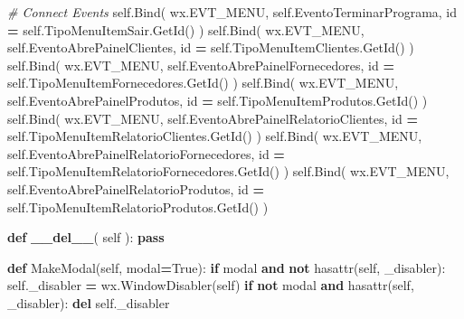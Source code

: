 \documentclass[
]{book}
\newenvironment{Shaded}{\begin{snugshade}}{\end{snugshade}}
\newcommand{\BuiltInTok}[1]{#1}
\newcommand{\CommentTok}[1]{\textcolor[rgb]{0.56,0.35,0.01}{\textit{#1}}}
\newcommand{\ControlFlowTok}[1]{\textcolor[rgb]{0.13,0.29,0.53}{\textbf{#1}}}
\newcommand{\FunctionTok}[1]{\textcolor[rgb]{0.13,0.29,0.53}{\textbf{#1}}}
\newcommand{\KeywordTok}[1]{\textcolor[rgb]{0.13,0.29,0.53}{\textbf{#1}}}
\newcommand{\NormalTok}[1]{#1}
\newcommand{\OperatorTok}[1]{\textcolor[rgb]{0.81,0.36,0.00}{\textbf{#1}}}
\newcommand{\StringTok}[1]{\textcolor[rgb]{0.31,0.60,0.02}{#1}}
\newcommand{\VariableTok}[1]{\textcolor[rgb]{0.00,0.00,0.00}{#1}}
\begin{document}
\begin{Shaded}
\begin{Highlighting}[]
       \CommentTok{\# Connect Events}
       \VariableTok{self}\NormalTok{.Bind( wx.EVT\_MENU, }\VariableTok{self}\NormalTok{.EventoTerminarPrograma,                }\BuiltInTok{id} \OperatorTok{=} \VariableTok{self}\NormalTok{.TipoMenuItemSair.GetId()                  )}
       \VariableTok{self}\NormalTok{.Bind( wx.EVT\_MENU, }\VariableTok{self}\NormalTok{.EventoAbrePainelClientes,              }\BuiltInTok{id} \OperatorTok{=} \VariableTok{self}\NormalTok{.TipoMenuItemClientes.GetId()              )}
       \VariableTok{self}\NormalTok{.Bind( wx.EVT\_MENU, }\VariableTok{self}\NormalTok{.EventoAbrePainelFornecedores,          }\BuiltInTok{id} \OperatorTok{=} \VariableTok{self}\NormalTok{.TipoMenuItemFornecedores.GetId()          )}
       \VariableTok{self}\NormalTok{.Bind( wx.EVT\_MENU, }\VariableTok{self}\NormalTok{.EventoAbrePainelProdutos,              }\BuiltInTok{id} \OperatorTok{=} \VariableTok{self}\NormalTok{.TipoMenuItemProdutos.GetId()              )}
       \VariableTok{self}\NormalTok{.Bind( wx.EVT\_MENU, }\VariableTok{self}\NormalTok{.EventoAbrePainelRelatorioClientes,     }\BuiltInTok{id} \OperatorTok{=} \VariableTok{self}\NormalTok{.TipoMenuItemRelatorioClientes.GetId()     )}
       \VariableTok{self}\NormalTok{.Bind( wx.EVT\_MENU, }\VariableTok{self}\NormalTok{.EventoAbrePainelRelatorioFornecedores, }\BuiltInTok{id} \OperatorTok{=} \VariableTok{self}\NormalTok{.TipoMenuItemRelatorioFornecedores.GetId() )}
       \VariableTok{self}\NormalTok{.Bind( wx.EVT\_MENU, }\VariableTok{self}\NormalTok{.EventoAbrePainelRelatorioProdutos,     }\BuiltInTok{id} \OperatorTok{=} \VariableTok{self}\NormalTok{.TipoMenuItemRelatorioProdutos.GetId()     )}

   \KeywordTok{def} \FunctionTok{\_\_del\_\_}\NormalTok{( }\VariableTok{self}\NormalTok{ ):}
       \ControlFlowTok{pass}

   \KeywordTok{def}\NormalTok{ MakeModal(}\VariableTok{self}\NormalTok{, modal}\OperatorTok{=}\VariableTok{True}\NormalTok{):}
       \ControlFlowTok{if}\NormalTok{ modal }\KeywordTok{and} \KeywordTok{not} \BuiltInTok{hasattr}\NormalTok{(}\VariableTok{self}\NormalTok{, }\StringTok{\textquotesingle{}\_disabler\textquotesingle{}}\NormalTok{):}
           \VariableTok{self}\NormalTok{.\_disabler }\OperatorTok{=}\NormalTok{ wx.WindowDisabler(}\VariableTok{self}\NormalTok{)}
       \ControlFlowTok{if} \KeywordTok{not}\NormalTok{ modal }\KeywordTok{and} \BuiltInTok{hasattr}\NormalTok{(}\VariableTok{self}\NormalTok{, }\StringTok{\textquotesingle{}\_disabler\textquotesingle{}}\NormalTok{):}
           \KeywordTok{del} \VariableTok{self}\NormalTok{.\_disabler}


\end{Highlighting}
\end{Shaded}
\end{document}
